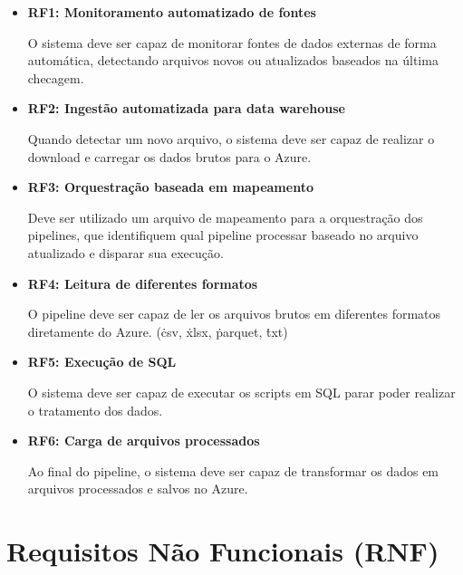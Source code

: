 \begin{itemize}
  \item \textbf{RF1: Monitoramento automatizado de fontes}

  O sistema deve ser capaz de monitorar fontes de dados externas de forma automática, detectando arquivos novos ou atualizados baseados na última checagem.

  \item \textbf{RF2: Ingestão automatizada para data warehouse}
  
  Quando detectar um novo arquivo, o sistema deve ser capaz de realizar o download e carregar os dados brutos para o Azure.

  \item \textbf{RF3: Orquestração baseada em mapeamento}
  
  Deve ser utilizado um arquivo de mapeamento para a orquestração dos pipelines, que identifiquem qual pipeline processar baseado no arquivo atualizado e disparar sua execução.

  \item \textbf{RF4: Leitura de diferentes formatos}
  
  O pipeline deve ser capaz de ler os arquivos brutos em diferentes formatos diretamente do Azure. (\.csv, \.xlsx, \.parquet, \.txt)

  \item \textbf{RF5: Execução de SQL}
  
  O sistema deve ser capaz de executar os scripts em SQL parar poder realizar o tratamento dos dados.

  \item \textbf{RF6: Carga de arquivos processados}
  
  Ao final do pipeline, o sistema deve ser capaz de transformar os dados em arquivos processados e salvos no Azure.

\end{itemize}

\section{Requisitos Não Funcionais (RNF)}

